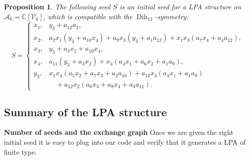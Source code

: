 \documentclass[10pt,a4paper]{amsart}
\numberwithin{equation}{section}
\newtheorem{prop}[thm]{Proposition}
\theoremstyle{definition}
\newcommand{\CC}{\mathbb{C}}
\DeclareMathOperator{\Dih}{Dih}
\begin{document}
\begin{prop}\label{prop!initial-seed}
The following seed $S$ is an initial seed for a LPA structure on $\mathcal A_6=\CC[\mathcal V_6]$, which is compatible with the $\Dih_{12}$-symmetry:
\[ S = \begin{cases}
x_1, & y_3 + a_{12}a_1, \\
x_2, & a_2x_1(y_3 + a_{10}x_4) + a_9x_3(y_3 + a_1a_{12}) + x_1x_3(a_7x_4 + a_4a_{12}), \\
x_3, & y_3 + a_3x_2 + a_{10}x_4, \\
x_4, & a_{11}(y_3 + a_3x_2) + x_3(a_4x_1 + a_6x_2 + a_1a_9), \\
y_3, & x_1x_4(a_5 x_2 + a_7x_3 + a_2a_{10}) + a_{12}x_3(a_4x_1 + a_1a_9)\\
&\quad + a_{12}x_2(a_6x_3 + a_8x_4 + a_3a_{11}).
\end{cases}\]
\end{prop}



\subsection{Summary of the LPA structure}

{\bf Number of seeds and the exchange graph}
Once we are given the right initial seed it is easy to plug into our code and verify that it generates a LPA of finite type.
\end{document}

